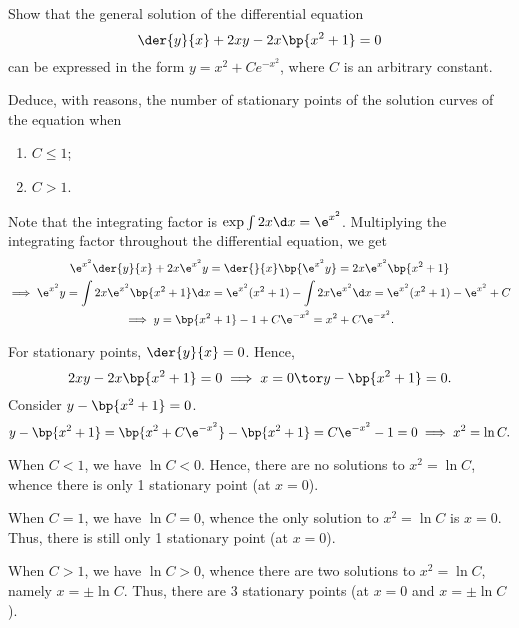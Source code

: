 \begin{problem}
    Show that the general solution of the differential equation \[\der{y}{x} + 2xy - 2x \bp{x^2 + 1} = 0\] can be expressed in the form $y = x^2 + Ce^{-x^2}$, where $C$ is an arbitrary constant.
        
    Deduce, with reasons, the number of stationary points of the solution curves of the equation when
    \begin{enumerate}
        \item $C \leq 1$;
        \item $C > 1$.
    \end{enumerate}
\end{problem}
\begin{solution}
    Note that the integrating factor is $\exp{ \int 2x \d x} = \e^{x^2}$. Multiplying the integrating factor throughout the differential equation, we get
    \begin{gather*}
        \e^{x^2}\der{y}{x} + 2x\e^{x^2}y = \der{}{x} \bp{\e^{x^2} y} = 2x\e^{x^2} \bp{x^2 + 1} \\
        \implies \e^{x^2} y = \int 2x\e^{x^2} \bp{x^2 + 1} \d x = \e^{x^2}(x^2 + 1) - \int 2x \e^{x^2} \d x = \e^{x^2} (x^2 + 1) - \e^{x^2} + C\\
        \implies y = \bp{x^2 + 1} - 1 + C\e^{-x^2} = x^2 + C\e^{-x^2}.
    \end{gather*}

    For stationary points, $\der{y}{x} = 0$. Hence, \[2xy - 2x\bp{x^2 + 1} = 0 \implies x = 0 \tor y - \bp{x^2 + 1} = 0.\] Consider $y - \bp{x^2 + 1} = 0$. \[y - \bp{x^2 + 1} = \bp{x^2 + C\e^{-x^2}} - \bp{x^2 + 1} = C\e^{-x^2} - 1 = 0 \implies x^2 = \ln C.\]

    \begin{ppart}
        When $C < 1$, we have $\ln C < 0$. Hence, there are no solutions to $x^2 = \ln C$, whence there is only 1 stationary point (at $x = 0$).

        When $C = 1$, we have $\ln C = 0$, whence the only solution to $x^2 = \ln C$ is $x = 0$. Thus, there is still only 1 stationary point (at $x = 0$).
    \end{ppart}
    \begin{ppart}
        When $C > 1$, we have $\ln C > 0$, whence there are two solutions to $x^2 = \ln C$, namely $x = \pm \ln C$. Thus, there are 3 stationary points (at $x = 0$ and $x = \pm \ln C$).
    \end{ppart}
\end{solution}

